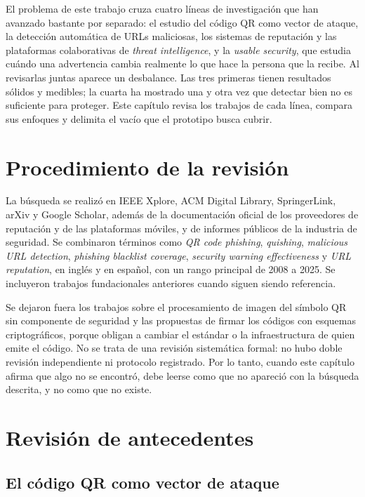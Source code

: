 \label{chap:antecedentes}
El problema de este trabajo cruza cuatro líneas de investigación que han avanzado bastante por separado: el estudio del código QR como vector de ataque, la detección automática de URLs maliciosas, los sistemas de reputación y las plataformas colaborativas de \emph{threat intelligence}, y la \emph{usable security}, que estudia cuándo una advertencia cambia realmente lo que hace la persona que la recibe. Al revisarlas juntas aparece un desbalance. Las tres primeras tienen resultados sólidos y medibles; la cuarta ha mostrado una y otra vez que detectar bien no es suficiente para proteger. Este capítulo revisa los trabajos de cada línea, compara sus enfoques y delimita el vacío que el prototipo busca cubrir.

\section{Procedimiento de la revisión}

La búsqueda se realizó en IEEE Xplore, ACM Digital Library, SpringerLink, arXiv y Google Scholar, además de la documentación oficial de los proveedores de reputación y de las plataformas móviles, y de informes públicos de la industria de seguridad. Se combinaron términos como \emph{QR code phishing}, \emph{quishing}, \emph{malicious URL detection}, \emph{phishing blacklist coverage}, \emph{security warning effectiveness} y \emph{URL reputation}, en inglés y en español, con un rango principal de 2008 a 2025. Se incluyeron trabajos fundacionales anteriores cuando siguen siendo referencia.

Se dejaron fuera los trabajos sobre el procesamiento de imagen del símbolo QR sin componente de seguridad y las propuestas de firmar los códigos con esquemas criptográficos, porque obligan a cambiar el estándar o la infraestructura de quien emite el código. No se trata de una revisión sistemática formal: no hubo doble revisión independiente ni protocolo registrado. Por lo tanto, cuando este capítulo afirma que algo no se encontró, debe leerse como que no apareció con la búsqueda descrita, y no como que no existe.

\section{Revisión de antecedentes}

\subsection{El código QR como vector de ataque}


